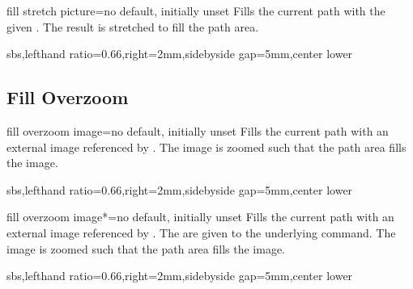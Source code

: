 \documentclass[a4paper,11pt]{article}
\begin{document}
\begin{myvoid}
\begin{docTikzKey}{fill stretch picture}{=}{no default, initially unset}
  Fills the current path with the given .
  The result is stretched to fill the path area.
\begin{dispExample*}{sbs,lefthand ratio=0.66,right=2mm,sidebyside gap=5mm,center lower}
\end{dispExample*}
\end{docTikzKey}


\clearpage
\subsection{Fill Overzoom}
\begin{docTikzKey}{fill overzoom image}{=}{no default, initially unset}
  Fills the current path with an external image referenced by .
  The image is zoomed such that the path area fills the image.
\begin{dispExample*}{sbs,lefthand ratio=0.66,right=2mm,sidebyside gap=5mm,center lower}
\end{dispExample*}
\end{docTikzKey}


\begin{docTikzKey}{fill overzoom image*}{=}{no default, initially unset}
  Fills the current path with an external image referenced by .
  The  are given to the underlying  command.
  The image is zoomed such that the path area fills the image.
\begin{dispExample*}{sbs,lefthand ratio=0.66,right=2mm,sidebyside gap=5mm,center lower}
\end{dispExample*}
\end{docTikzKey}



\end{myvoid}
\end{document}
